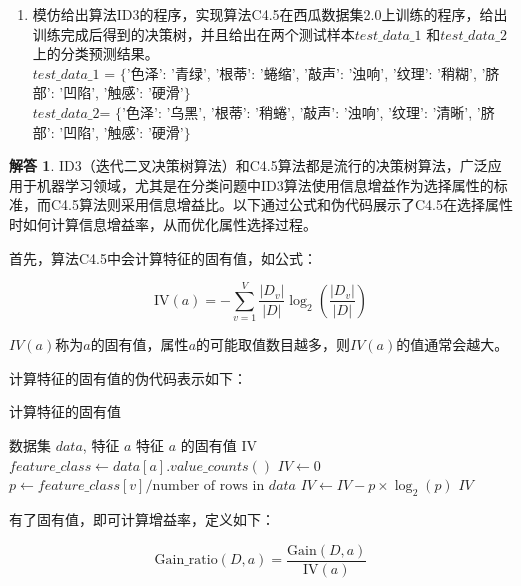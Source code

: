 \documentclass[a4paper,UTF8]{article}
\numberwithin{equation}{section}
\theoremstyle{definition}
\newtheorem*{solution}{解答}
\begin{document}
\bigskip

\begin{enumerate}[\textbf{题目 2:}] %
\item 模仿给出算法ID3的程序，实现算法C4.5在西瓜数据集2.0上训练的程序，给出训练完成后得到的决策树，并且给出在两个测试样本$test\_data\_1$ 和$test\_data\_2$ 上的分类预测结果。\\
$test\_data\_1$ = $\{$'色泽': '青绿', '根蒂': '蜷缩', '敲声': '浊响', '纹理': '稍糊', '脐部': '凹陷', '触感': '硬滑'$\}$\\
$test\_data\_2 $= $\{$'色泽': '乌黑', '根蒂': '稍蜷', '敲声': '浊响', '纹理': '清晰', '脐部': '凹陷', '触感': '硬滑'$\}$
\end{enumerate}


\begin{solution}

ID3（迭代二叉决策树算法）和C4.5算法都是流行的决策树算法，广泛应用于机器学习领域，尤其是在分类问题中ID3算法使用信息增益作为选择属性的标准，而C4.5算法则采用信息增益比。以下通过公式和伪代码展示了C4.5在选择属性时如何计算信息增益率，从而优化属性选择过程。

首先，算法C4.5中会计算特征的固有值，如公式：

\begin{equation}
    \text{IV}(a) = -\sum_{v=1}^{V} \frac{|D_v|}{|D|} \log_2 \left(\frac{|D_v|}{|D|}\right)
\end{equation}

$IV(a)$称为$a$的固有值，属性$a$的可能取值数目越多，则$IV(a)$的值通常会越大。

计算特征的固有值的伪代码表示如下：

\begin{algorithm}[H]
\caption{计算特征的固有值}
\begin{algorithmic}[1]
\Require 数据集 $data$, 特征 $a$
\Ensure 特征 $a$ 的固有值 IV
\State $feature\_class \gets data[a].value\_counts()$
\State $IV \gets 0$
    \State $p \gets feature\_class[v] / \text{number of rows in } data$
        \State $IV \gets IV - p \times \log_2(p)$
    \EndIf
\EndFor
\State \Return $IV$
\end{algorithmic}
\end{algorithm}

有了固有值，即可计算增益率，定义如下：

\begin{equation}
    \text{Gain\_ratio}(D, a) = \frac{\text{Gain}(D, a)}{\text{IV}(a)}
\end{equation}


\end{solution}
\end{document}
